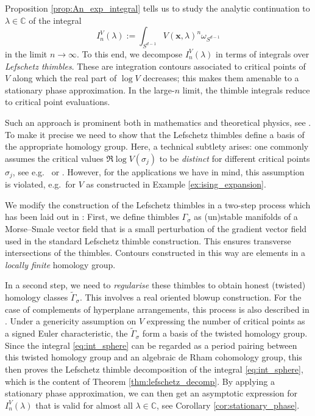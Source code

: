 \documentclass[11pt, a4paper]{article}
\numberwithin{theorem}{section}
\theoremstyle{remark}
\newcommand{\CC}{\mathbb{C}}
\renewcommand{\Re}{\mathfrak{R}}
\newcommand{\bb}[1]{\boldsymbol{#1}}
\theoremstyle{theorem}
\begin{document}
Proposition \ref{prop:An_exp_integral} tells us to study the analytic continuation to $\lambda\in\CC$ of the integral
\begin{equation}
  \label{eq:int_sphere}
  I^V_n(\lambda) := \int_{S^{d-1}} V(\bb{x},\lambda)^n \omega_{S^{d-1}}
\end{equation}
in the limit $n\rightarrow \infty$. To this end, we decompose $I_n^V(\lambda)$ in terms of integrals over \emph{Lefschetz thimbles}. These are integration contours associated to critical points of $V$ along which the real part of $\log V$ decreases; this makes them amenable to a stationary phase approximation. In the large-$n$ limit, the thimble integrals reduce to critical point evaluations.\par 
Such an approach is prominent both in mathematics and theoretical physics, see \cite{delabaere2002global, witten2011analytic}. To make it precise we need to show that the Lefschetz thimbles define a basis of the appropriate homology group. Here, a technical subtlety arises: 
one commonly assumes the critical values $\Re \log V(\sigma_j)$ to be \emph{distinct} for different critical points $\sigma_j$, see e.g.\ \cite[Hypothesis H4]{delabaere2002global} or \cite[Assumption 8]{aomoto2011theory}. However, for the applications we have in mind, this assumption is violated, e.g.\ for $V$ as constructed in Example \ref{ex:ising_expansion}. \par 
We modify the construction of the Lefschetz thimbles in a two-step process which has been laid out in \cite[\S 4]{matsubara2023localization}: 
First, we define thimbles $\Gamma_\sigma$ as (un)stable manifolds of a Morse--Smale vector field that is a small perturbation of the gradient vector field used in the standard Lefschetz thimble construction. This ensures transverse intersections of the thimbles. 
Contours constructed in this way are elements in a \emph{locally finite} homology group. \par

In a second step, we need to \emph{regularise} these thimbles to obtain honest (twisted) homology classes $\widetilde{\Gamma}_\sigma$. This involves a real oriented blowup construction. For the case of complements of hyperplane arrangements, this process is also described in \cite[\S 3.2.3--3.2.5]{aomoto2011theory}.
Under a genericity assumption on $V$ expressing the number of critical points as a signed Euler characteristic, the $\widetilde{\Gamma}_\sigma$ form a basis of the twisted homology group.
Since the integral \eqref{eq:int_sphere} can be regarded as a period pairing between this twisted homology group and an algebraic de Rham cohomology group, this then proves the Lefschetz thimble decomposition of the integral \eqref{eq:int_sphere}, which is the content of Theorem \ref{thm:lefschetz_decomp}. By applying a stationary phase approximation, we can then get an asymptotic expression for $I_n^V(\lambda)$ that is valid for almost all $\lambda\in\CC$, see Corollary \ref{cor:stationary_phase}.\par
\end{document}
